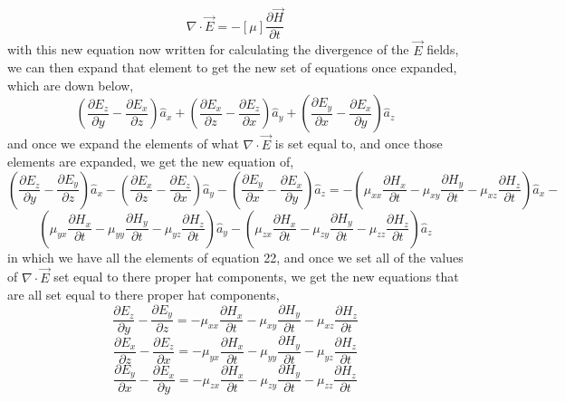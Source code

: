 \documentclass[]{article}
\begin{document}
\begin{equation}
\nabla \cdot \vec{E} = -[\mu] \frac{\partial{\vec{H}}}{\partial{t}}
\end{equation}
with this new equation now written for calculating the divergence of the $\vec{E}$ fields, we can then expand that element to get the new set of equations once expanded, which are down below,
\begin{equation}
{(\frac{\partial{E}_z}{\partial{y}} - \frac{\partial{E}_x}{\partial{z}})\hat{a}_x + (\frac{\partial{E}_x}{\partial{z}} - \frac{\partial{E}_z}{\partial{x}})\hat{a}_y + (\frac{\partial{E}_y}{\partial{x}} - \frac{\partial{E}_x}{\partial{y}})\hat{a}_z}
\end{equation}
and once we expand the elements of what $\nabla \cdot \vec{E}$ is set equal to, and once those elements are expanded, we get the new equation of,
\[(\frac{\partial{E}_z}{\partial{y}} - \frac{\partial{E}_y}{\partial{z}})\hat{a}_x - (\frac{\partial{E}_x}{\partial{z}} - \frac{\partial{E}_z}{\partial{x}})\hat{a}_y - (\frac{\partial{E}_y}{\partial{x}} - \frac{\partial{E}_x}{\partial{y}})\hat{a}_z = 
-(\mu_{xx}\frac{\partial{H}_x}{\partial{t}} - \mu_{xy}\frac{\partial{H}_y}{\partial{t}} - \mu_{xz}\frac{\partial{H}_z}{\partial{t}})\hat{a}_x -\]
\[(\mu_{yx}\frac{\partial{H}_x}{\partial{t}} - \mu_{yy}\frac{\partial{H}_y}{\partial{t}} - \mu_{yz}\frac{\partial{H}_z}{\partial{t}})\hat{a}_y - (\mu_{zx}\frac{\partial{H}_x}{\partial{t}} - \mu_{zy}\frac{\partial{H}_y}{\partial{t}} - \mu_{zz}\frac{\partial{H}_z}{\partial{t}})\hat{a}_z\]
in which we have all the elements of equation 22, and once we set all of the values of $\nabla \cdot \vec{E}$ set equal to there proper hat components, we get the new equations that are all set equal to there proper hat components,
\begin{equation}
\frac{\partial{E}_z}{\partial{y}} - \frac{\partial{E}_y}{\partial{z}} = -\mu_{xx}\frac{\partial{H}_x}{\partial{t}} - \mu_{xy}\frac{\partial{H}_y}{\partial{t}} - \mu_{xz}\frac{\partial{H}_z}{\partial{t}} 
\end{equation}
\begin{equation}
\frac{\partial{E}_x}{\partial{z}} - \frac{\partial{E}_z}{\partial{x}} = -\mu_{yx}\frac{\partial{H}_x}{\partial{t}} - \mu_{yy}\frac{\partial{H}_y}{\partial{t}} - \mu_{yz}\frac{\partial{H}_z}{\partial{t}}
\end{equation}
\begin{equation}
\frac{\partial{E}_y}{\partial{x}} - \frac{\partial{E}_x}{\partial{y}} = -\mu_{zx}\frac{\partial{H}_x}{\partial{t}} - \mu_{zy}\frac{\partial{H}_y}{\partial{t}} - \mu_{zz}\frac{\partial{H}_z}{\partial{t}}
\end{equation}
\end{document}
